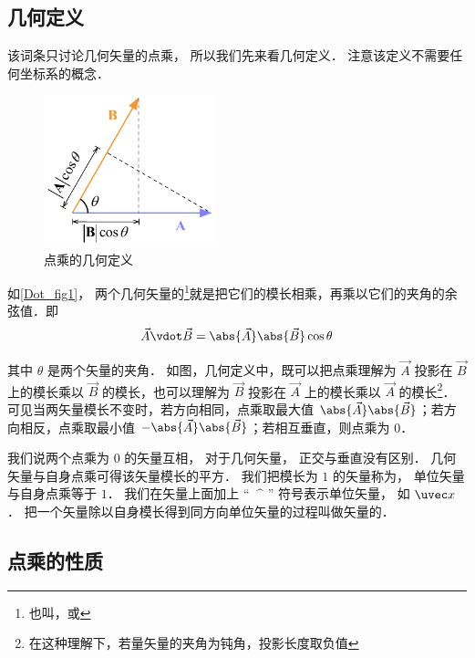 

\subsection{几何定义}
该词条只讨论几何矢量的点乘， 所以我们先来看几何定义． 注意该定义不需要任何坐标系的概念．
\begin{figure}[th]
\centering
\includegraphics[width=5cm]{./figures/Dot1.pdf}
\caption{点乘的几何定义}\label{Dot_fig1}
\end{figure}

如\autoref{Dot_fig1}， 两个几何矢量的\footnote{也叫，或}就是把它们的模长相乘，再乘以它们的夹角的余弦值．即
\begin{equation}\label{Dot_eq1}
\vec A \vdot \vec B = \abs{\vec A} \abs{\vec B} \cos\theta 
\end{equation}

其中 $\theta$ 是两个矢量的夹角． 如图，几何定义中，既可以把点乘理解为 $\vec A$ 投影在 $\vec B$ 上的模长乘以 $\vec B$ 的模长，也可以理解为 $\vec B$ 投影在 $\vec A$ 上的模长乘以 $\vec A$ 的模长\footnote{在这种理解下，若量矢量的夹角为钝角，投影长度取负值}．可见当两矢量模长不变时，若方向相同，点乘取最大值 $\abs{\vec A}\abs{\vec B}$；若方向相反，点乘取最小值 $-\abs{\vec A}\abs{\vec B}$；若相互垂直，则点乘为 0．

我们说两个点乘为 0 的矢量互相， 对于几何矢量， 正交与垂直没有区别． 几何矢量与自身点乘可得该矢量模长的平方． 我们把模长为 $1$ 的矢量称为， 单位矢量与自身点乘等于 $1$． 我们在矢量上面加上 “ $\ \^$ ” 符号表示单位矢量， 如 $\uvec x$． 把一个矢量除以自身模长得到同方向单位矢量的过程叫做矢量的．

\subsection{点乘的性质}

